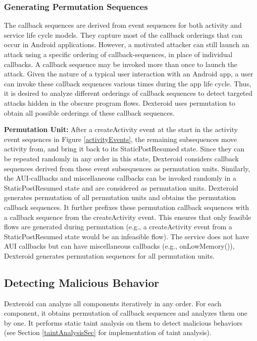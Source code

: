 \documentclass[10pt]{elsarticle}
\begin{document}
\subsubsection {Generating Permutation Sequences} 

The callback sequences are derived from event sequences for both activity and service life cycle models. They capture most of the callback orderings that can occur in Android applications. However, a  motivated attacker can still launch an attack using a specific ordering of callback-sequences, in place of individual callbacks. A callback sequence may be invoked more than once to launch the attack. Given the nature of a typical user interaction with an Android app, a user can invoke these callback sequences various times during the app life cycle. Thus, it is desired to analyze different orderings of callback sequences to detect targeted attacks hidden in the obscure program flows. Dexteroid uses permutation to obtain all possible orderings of these callback sequences. 

{\noindent \bf Permutation Unit:} After a createActivity event at the start in the activity event sequences in Figure \ref{activityEvents}, the remaining subsequences move activity from, and bring it back to its StaticPostResumed state. Since they can be repeated randomly in any order in this state, Dexteroid considers callback sequences derived from these event subsequences as permutation units. Similarly, the AUI-callbacks and miscellaneous callbacks can be invoked randomly in a StaticPostResumed state and are considered as permutation units. Dexteroid generates permutation of all permutation units and obtains the permutation callback sequences. It further prefixes these permutation callback sequences with a callback sequence from the createActivity event. This ensures that only feasible flows are generated during permutation (e.g., a createActivity event from a StaticPostResumed state would be an infeasible flow). The service does not have AUI callbacks but can have miscellaneous callbacks (e.g., {\ttfamily onLowMemory()}), Dexteroid generates permutation sequences for all permutation units.

\subsection {Detecting Malicious Behavior} \label{secMalBehavior}

Dexteroid can analyze all components iteratively in any order. For each component, it obtains permutation of callback sequences and analyzes them one by one. It performs static taint analysis on them to detect malicious behaviors (see Section \ref{taintAnalysisSec} for implementation of taint analysis). 
\end{document}
